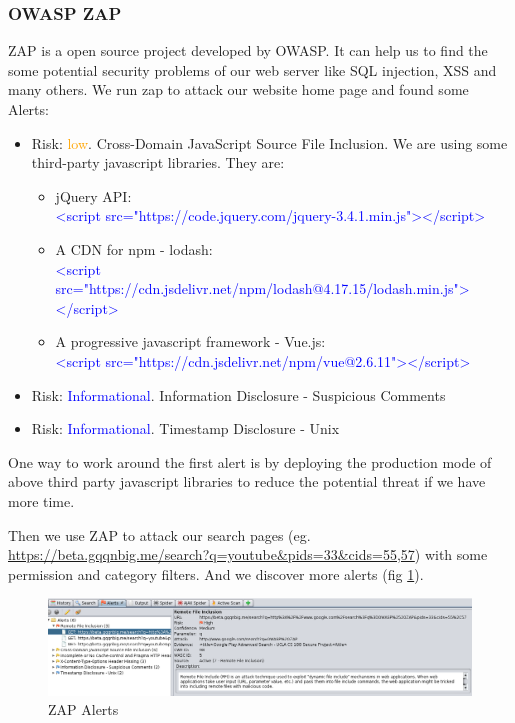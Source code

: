 \documentclass[12pt, a4paper]{article}
\newcommand{\code}[1]{\texttt{#1}}
\begin{document}
\subsubsection{OWASP ZAP}
ZAP is a open source project developed by OWASP. It can help us to find the some potential security problems of our web server like SQL injection, XSS and many others.
We run zap to attack our website home page and found some Alerts:
\begin{itemize}
    \item Risk: \textcolor{orange}{low}. Cross-Domain JavaScript Source File Inclusion. We are using some third-party javascript libraries. They are:
    \begin{itemize}
        \item jQuery API:\\ \textcolor{blue}{<script src="https://code.jquery.com/jquery-3.4.1.min.js"></script>}
        \item A CDN for npm - lodash:\\ \textcolor{blue}{<script src="https://cdn.jsdelivr.net/npm/lodash@4.17.15/lodash.min.js"></script>}
        \item A progressive javascript framework - Vue.js:\\ \textcolor{blue}{<script src="https://cdn.jsdelivr.net/npm/vue@2.6.11"></script>}
    \end{itemize}
    \item Risk: \textcolor{blue}{Informational}. Information Disclosure - Suspicious Comments
    \item Risk: \textcolor{blue}{Informational}. Timestamp Disclosure - Unix
\end{itemize}
One way to work around the first alert is by deploying the production mode of above third party javascript libraries to reduce the potential threat if we have more time.

Then we use ZAP to attack our search pages (eg. \url{ https://beta.gqqnbig.me/search?q=youtube&pids=33&cids=55,57}) with some permission and category filters.
And we discover more alerts (fig \ref{fig:zap-alerts}).

\begin{figure}[H]
\centering
\includegraphics[width=\textwidth, frame]{zap_alerts.png}
\caption{ZAP Alerts}
\label{fig:zap-alerts}
\end{figure}
\end{document}
